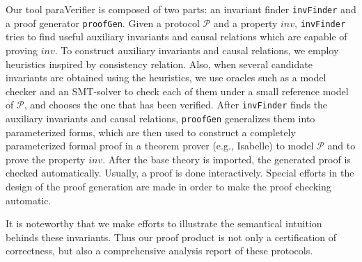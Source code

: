\documentclass[conference]{IEEEtran}
\begin{document}
{Our tool {\sf paraVerifier} is composed of two parts:  an invariant finder {\tt invFinder}
and a proof generator {\tt proofGen}. %
Given a protocol $\mathcal{P}$ and a property $inv$, {\tt invFinder} tries to find useful auxiliary invariants and causal relations which are capable of proving $inv$. To construct auxiliary invariants and causal relations, we employ heuristics inspired by consistency relation. Also, when several candidate invariants are obtained using the heuristics, we use oracles such as a model checker and an SMT-solver to check each of them under a small reference model of $\mathcal{P}$, and chooses the one that has been verified. After {\tt invFinder} finds the auxiliary invariants and causal relations, {\tt proofGen} generalizes them  into  parameterized forms, which are then used to construct a completely parameterized formal proof in a theorem prover (e.g., Isabelle) to model $\mathcal{P}$ and to prove the property $inv$. After the base theory is imported, the generated proof is checked automatically.  Usually, a proof is done interactively. Special efforts in the design of the proof generation are made in order to make the proof checking automatic. %


It is noteworthy that we make efforts to illustrate the semantical intuition behinds these invariants. Thus our proof product is not only a certification of correctness, but also a comprehensive analysis report of these  protocols.



}
\end{document}
